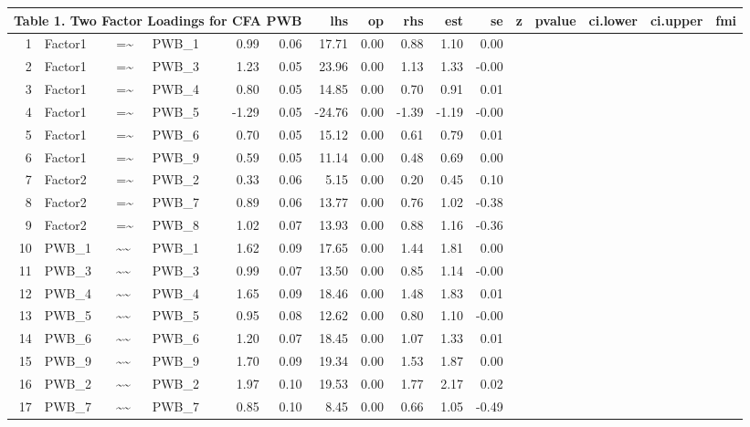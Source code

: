 \documentclass{article}
\begin{document}



\begin{table}[ht]
\centering
\begin{tabular}{rlllrrrrrrr}
 \multicolumn{ 6 }{l}{ Table 1. Two Factor Loadings for CFA PWB} \cr 
  \hline
 & lhs & op & rhs & est & se & z & pvalue & ci.lower & ci.upper & fmi \\ 
  \hline
1 & Factor1 & =\~{} & PWB\_1 & 0.99 & 0.06 & 17.71 & 0.00 & 0.88 & 1.10 & 0.00 \\ 
  2 & Factor1 & =\~{} & PWB\_3 & 1.23 & 0.05 & 23.96 & 0.00 & 1.13 & 1.33 & -0.00 \\ 
  3 & Factor1 & =\~{} & PWB\_4 & 0.80 & 0.05 & 14.85 & 0.00 & 0.70 & 0.91 & 0.01 \\ 
  4 & Factor1 & =\~{} & PWB\_5 & -1.29 & 0.05 & -24.76 & 0.00 & -1.39 & -1.19 & -0.00 \\ 
  5 & Factor1 & =\~{} & PWB\_6 & 0.70 & 0.05 & 15.12 & 0.00 & 0.61 & 0.79 & 0.01 \\ 
  6 & Factor1 & =\~{} & PWB\_9 & 0.59 & 0.05 & 11.14 & 0.00 & 0.48 & 0.69 & 0.00 \\ 
  7 & Factor2 & =\~{} & PWB\_2 & 0.33 & 0.06 & 5.15 & 0.00 & 0.20 & 0.45 & 0.10 \\ 
  8 & Factor2 & =\~{} & PWB\_7 & 0.89 & 0.06 & 13.77 & 0.00 & 0.76 & 1.02 & -0.38 \\ 
  9 & Factor2 & =\~{} & PWB\_8 & 1.02 & 0.07 & 13.93 & 0.00 & 0.88 & 1.16 & -0.36 \\ 
  10 & PWB\_1 & \~{}\~{} & PWB\_1 & 1.62 & 0.09 & 17.65 & 0.00 & 1.44 & 1.81 & 0.00 \\ 
  11 & PWB\_3 & \~{}\~{} & PWB\_3 & 0.99 & 0.07 & 13.50 & 0.00 & 0.85 & 1.14 & -0.00 \\ 
  12 & PWB\_4 & \~{}\~{} & PWB\_4 & 1.65 & 0.09 & 18.46 & 0.00 & 1.48 & 1.83 & 0.01 \\ 
  13 & PWB\_5 & \~{}\~{} & PWB\_5 & 0.95 & 0.08 & 12.62 & 0.00 & 0.80 & 1.10 & -0.00 \\ 
  14 & PWB\_6 & \~{}\~{} & PWB\_6 & 1.20 & 0.07 & 18.45 & 0.00 & 1.07 & 1.33 & 0.01 \\ 
  15 & PWB\_9 & \~{}\~{} & PWB\_9 & 1.70 & 0.09 & 19.34 & 0.00 & 1.53 & 1.87 & 0.00 \\ 
  16 & PWB\_2 & \~{}\~{} & PWB\_2 & 1.97 & 0.10 & 19.53 & 0.00 & 1.77 & 2.17 & 0.02 \\ 
  17 & PWB\_7 & \~{}\~{} & PWB\_7 & 0.85 & 0.10 & 8.45 & 0.00 & 0.66 & 1.05 & -0.49 \\ 

\end{tabular}
\end{table}
\end{document}
